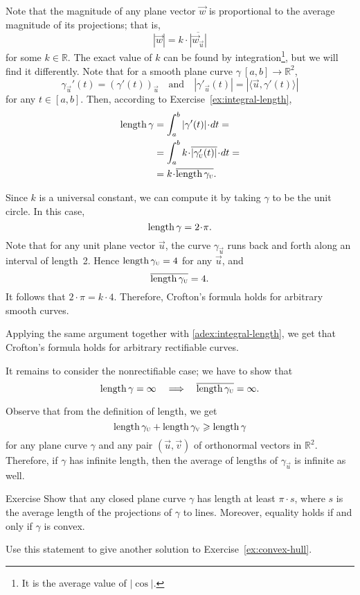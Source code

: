 Note that the magnitude of any plane vector ${\vec w}$ is proportional to the average magnitude of its projections; that is,
\[|{\vec w}|=k\cdot \overline{|{\vec w}_{\vec u}|}\]
for some $k \in \mathbb{R}$.
The exact value of $k$ can be found by integration\footnote{It is the average value of $|\cos|$.}, but we will find it differently. 
Note that for a smooth plane curve $\gamma\:[a,b]\to\mathbb{R}^2$,
\[\gamma_{\vec u}'(t)=(\gamma'(t))_{\vec u}
\quad\text{and}\quad
|\gamma'_{\vec u}(t)|=|\langle\vec u,\gamma'(t)\rangle|\]
for any $t \in [a,b]$. Then, according to Exercise~\ref{ex:integral-length},
\begin{align*}
\length\gamma
&=\int_a^b|\gamma'(t)|\cdot dt=
\\
&=\int_a^b  k\cdot \overline{|\gamma_{\vec u}'(t)|}\cdot dt=
\\
&=k\cdot \overline{\length\gamma_{\vec u}}.
\end{align*}

Since $k$ is a universal constant, we can compute it by taking $\gamma$ to be the unit circle.
In this case,
\[\length \gamma=2\cdot\pi.\]
Note that for any unit plane vector ${\vec u}$, the curve $\gamma_{\vec u}$ runs back and forth along an interval of length~2.
Hence $\mathop{\rm length}\nolimits\gamma_{\text{\sc{u}}}=4$ for any $\vec u$, and 
\[\overline{\mathop{\rm length}\nolimits\gamma_{\text{\sc{u}}}} =4.\]
It follows that $2\cdot \pi =k\cdot 4$.
Therefore, Crofton's formula holds for arbitrary smooth curves.

Applying the same argument together with \ref{adex:integral-length}, we get that Crofton's formula holds for arbitrary rectifiable curves.

It remains to consider the nonrectifiable case;
we have to show that 
\[\mathop{\rm length}\nolimits\gamma=\infty
\quad\Longrightarrow\quad
\overline{\mathop{\rm length}\nolimits\gamma_{\text{\sc{u}}}}=\infty.
\]

Observe that from the definition of length, we get
\[\mathop{\rm length}\nolimits\gamma_{\text{\sc{u}}}+\mathop{\rm length}\nolimits\gamma_{\text{\sc{v}}}\geqslant \mathop{\rm length}\nolimits\gamma\]
for any plane curve $\gamma$ and any pair $(\vec u , \vec v )$ of orthonormal vectors in $\mathbb{R}^2$.
Therefore, if $\gamma$ has infinite length, then the average of lengths of $\gamma_{\vec u}$ is infinite as well.
\qeds

\begin{thm}{Exercise}\label{ex:convex-croftons}
Show that any closed plane curve $\gamma$ has length at least $\pi\cdot s$, where $s$ is the average length of the projections of $\gamma$ to lines.
Moreover, equality holds if and only if $\gamma$ is convex.

Use this statement to give another solution to Exercise~\ref{ex:convex-hull}.
\end{thm}

